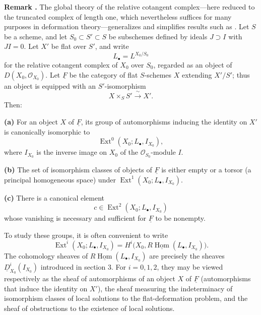\medskip
\noindent\textbf{Remark .}
The global theory of the relative cotangent complex---here reduced to
the truncated complex of length one, which nevertheless suffices for
many purposes in deformation theory---generalizes and simplifies
results such as . Let $S$ be a scheme, and let
$S_0\subset S'\subset S$ be subschemes defined by ideals
$J\supset I$ with $JI=0$. Let $X'$ be flat over $S'$, and write
\[
L_\bullet=L^{X_0/S_0}
\]
for the relative cotangent complex of $X_0$ over $S_0$, regarded as
an object of $D(X_0,\mathcal O_{X_0})$. Let $\underline F$ be the
category of flat $S$-schemes $X$ extending $X'/S'$; thus an object is
equipped with an $S'$-isomorphism
\[
X\times_SS'\xrightarrow{\ \sim\ }X'.
\]
Then:

\smallskip
\noindent\textbf{(a)} For an object $X$ of $\underline F$, its group
of automorphisms inducing the identity on $X'$ is canonically
isomorphic to
\[
\operatorname{Ext}^0(X_0;L_\bullet,I_{X_0}),
\]
where $I_{X_0}$ is the inverse image on $X_0$ of the
$\mathcal O_{S_0}$-module $I$.


\smallskip
\noindent\textbf{(b)} The set of isomorphism classes of objects of
$\underline F$ is either empty or a torsor (a principal homogeneous
space) under
$\operatorname{Ext}^1(X_0;L_\bullet,I_{X_0})$.

\smallskip
\noindent\textbf{(c)} There is a canonical element
\[
c\in\operatorname{Ext}^2(X_0;L_\bullet,I_{X_0})
\]
whose vanishing is necessary and sufficient for $\underline F$ to be
nonempty.

To study these groups, it is often convenient to write
\[
\operatorname{Ext}^i(X_0;L_\bullet,I_{X_0})
=H^i\bigl(X_0,R\underline{\operatorname{Hom}}
  (L_\bullet,I_{X_0})\bigr).
\]
The cohomology sheaves of
$R\underline{\operatorname{Hom}}(L_\bullet,I_{X_0})$ are precisely
the sheaves $\underline D^i_{X_0}(I_{X_0})$ introduced in section 3.
For $i=0,1,2$, they may be viewed respectively as the sheaf of
automorphisms of an object $X$ of $\underline F$ (automorphisms that
induce the identity on $X'$), the sheaf measuring the indeterminacy
of isomorphism classes of local solutions to the flat-deformation
problem, and the sheaf of obstructions to the existence of local
solutions.

